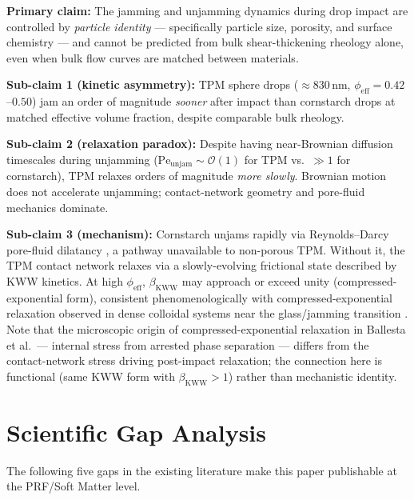 \documentclass[11pt,letterpaper]{article}
\newcommand{\phieff}{\phi_{\mathrm{eff}}}
\newcommand{\peunj}{\mathrm{Pe}_{\mathrm{unjam}}}
\newcommand{\bkww}{\beta_{\mathrm{KWW}}}
\begin{document}
\begin{claimbox}
\textbf{Primary claim:}
The jamming and unjamming dynamics during drop impact are controlled by
\emph{particle identity} --- specifically particle size, porosity, and surface
chemistry --- and cannot be predicted from bulk shear-thickening rheology alone,
even when bulk flow curves are matched between materials.

\medskip
\textbf{Sub-claim 1 (kinetic asymmetry):}
TPM sphere drops (${\approx}830$\,nm, $\phieff = 0.42$--$0.50$)
jam an order of magnitude \emph{sooner} after impact than cornstarch drops at
matched effective volume fraction, despite comparable bulk rheology.

\medskip
\textbf{Sub-claim 2 (relaxation paradox):}
Despite having near-Brownian diffusion timescales during unjamming
($\peunj \sim \mathcal{O}(1)$ for TPM vs.\ $\gg 1$ for cornstarch),
TPM relaxes orders of magnitude \emph{more slowly}. Brownian motion
does not accelerate unjamming; contact-network geometry and pore-fluid
mechanics dominate.

\medskip
\textbf{Sub-claim 3 (mechanism):}
Cornstarch unjams rapidly via Reynolds--Darcy pore-fluid dilatancy
\cite{Mobaseri2026}, a pathway unavailable to non-porous TPM.
Without it, the TPM contact network relaxes via a slowly-evolving
frictional state described by KWW kinetics. At high $\phieff$,
$\bkww$ may approach or exceed unity (compressed-exponential form),
consistent phenomenologically with compressed-exponential relaxation
observed in dense colloidal systems near the glass/jamming transition
\cite{Ballesta2008}. Note that the microscopic origin of compressed-exponential
relaxation in Ballesta et al.\ --- internal stress from arrested phase separation
--- differs from the contact-network stress driving post-impact relaxation; the
connection here is functional (same KWW form with $\bkww > 1$) rather than
mechanistic identity.
\end{claimbox}

\section{Scientific Gap Analysis}

The following five gaps in the existing literature make this paper publishable
at the PRF/Soft Matter level.
\end{document}
